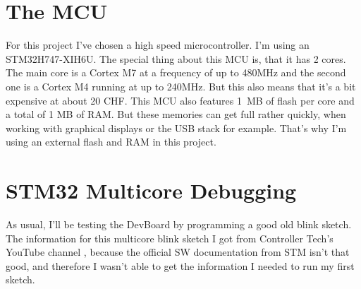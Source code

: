 \newpage
\section{The MCU}
For this project I've chosen a high speed microcontroller. I'm using an STM32H747-XIH6U. The special thing about this MCU is, that it has 2 cores. The main core is a Cortex M7 at a frequency of up to 480MHz and the second one is a Cortex M4 running at up to 240MHz. But this also means that it's a bit expensive at about 20 CHF. This MCU also features 1 MB of flash per core and a total of 1 MB of RAM. But these memories can get full rather quickly, when working with graphical displays or the USB stack for example. That's why I'm using an external flash and RAM in this project.


\section{STM32 Multicore Debugging}
As usual, I'll be testing the DevBoard by programming a good old blink sketch. The information for this multicore blink sketch I got from Controller Tech's YouTube channel \cite{YT_CT_Mutlicore_Debugging}, because the official SW documentation from STM isn't that good, and therefore I wasn't able to get the information I needed to run my first sketch.


